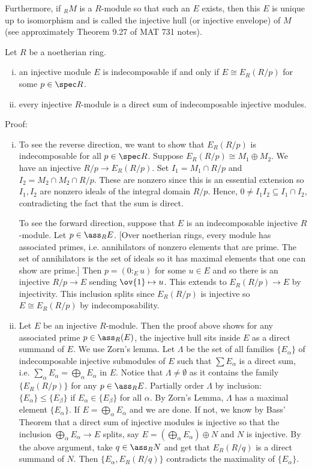 Furthermore, if $_R M$ is a $R$-module so that such an $E$ exists, then this $E$ is unique up to isomorphism and is called the injective hull (or injective envelope) of $M$ (see approximately Theorem 9.27 of MAT 731 notes). 

\begin{thmm}
Let $R$ be a noetherian ring.
\begin{enumerate}[(i)]
\item an injective module $E$ is indecomposable if and only if $E \cong E_R(R/p)$ for some $p \in \spec R$. 
\item every injective $R$-module is a direct sum of indecomposable injective modules.
\end{enumerate}
\end{thmm}

\noindent Proof:
\begin{enumerate}[(i)]
\item To see the reverse direction, we want to show that $E_R(R/p)$ is indecomposable for all $p \in \spec R$. Suppose $E_R(R/p) \cong M_1 \oplus M_2$. We have an injective $R/p \to E_R(R/p)$. Set $I_1=M_1 \cap R/p$ and $I_2=M_2 \cap M_2 \cap R/p$. These are nonzero since this is an essential extension so $I_1,I_2$ are nonzero ideals of the integral domain $R/p$. Hence, $0 \neq I_1I_2 \subseteq I_1 \cap I_2$, contradicting the fact that the sum is direct. 

To see the forward direction, suppose that $E$ is an indecomposable injective $R$-module. Let $p \in \ass_R E$. [Over noetherian rings, every module has associated primes, i.e. annihilators of nonzero elements that are prime. The set of annihilators is the set of ideals so it has maximal elements that one can show are prime.] Then $p=(0:_E u)$ for some $u \in E$ and so there is an injective $R/p \to E$ sending $\ov{1} \mapsto u$. This extends to $E_R(R/p) \to E$ by injectivity. This inclusion splits since $E_R(R/p)$ is injective so $E \cong E_R(R/p)$ by indecomposability. 

\item Let $E$ be an injective $R$-module. Then the proof above shows for any associated prime $p \in \ass_R(E)$, the injective hull sits inside $E$ as a direct summand of $E$. We use Zorn's lemma. Let $\Lambda$ be the set of all families $\{E_\alpha\}$ of indecomposable injective submodules of $E$ such that $\sum E_\alpha$ is a direct sum, i.e. $\sum_\alpha E_\alpha=\bigoplus_\alpha E_\alpha$ in $E$. Notice that $\Lambda \neq \emptyset$ as it contains the family $\{E_R(R/p)\}$ for any $p \in \ass_R E$. Partially order $\Lambda$ by inclusion: $\{E_\alpha\} \leq \{E_\beta\}$ if $E_\alpha \in \{E_\beta\}$ for all $\alpha$. By Zorn's Lemma, $\Lambda$ has a maximal element $\{E_\alpha\}$. If $E=\bigoplus_\alpha E_\alpha$ and we are done. If not, we know by Bass' Theorem that a direct sum of injective modules is injective so that the inclusion $\bigoplus_\alpha E_\alpha \to E$ splits, say $E=\left(\bigoplus_\alpha E_\alpha \right) \oplus N$ and $N$ is injective. By the above argument, take $q \in \ass_R N$ and get that $E_R(R/q)$ is a direct summand of $N$. Then $\{E_\alpha,E_R(R/q)\}$ contradicts the maximality of $\{E_\alpha\}$. 
\end{enumerate}
